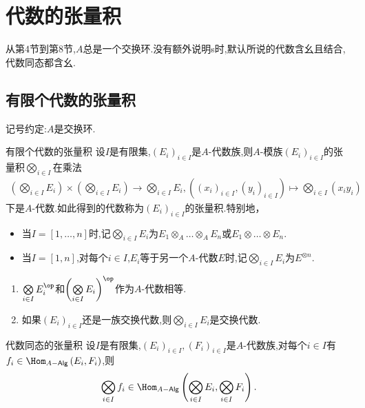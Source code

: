\chapter{代数的张量积}

从第$4$节到第$8$节,$A$总是一个交换环.没有额外说明s时,默认所说的代数含幺且结合,代数同态都含幺.

\section{有限个代数的张量积}

记号约定:$A$是交换环.

\begin{definition}{有限个代数的张量积}{}
	设$I$是有限集,$\left(E_{i}\right)_{i\in I}$是$A$-代数族,则$A$-模族$\left(E_{i}\right)_{i\in I}$的张量积$\bigotimes\limits_{i\in I}$在乘法
	\begin{align*}
		\left(\bigotimes\limits_{i\in I}E_{i}\right)\times\left(\bigotimes\limits_{i\in I}E_{i}\right)\to\bigotimes\limits_{i\in I}E_{i},\left(\left(x_{i}\right)_{i\in I},\left(y_{i}\right)_{i\in I}\right)\mapsto\bigotimes\limits_{i\in I}\left(x_{i}y_{i}\right)
	\end{align*}
	下是$A$-代数.如此得到的代数称为$\left(E_{i}\right)_{i\in I}$的张量积.特别地，
	\begin{itemize}
		\item 当$I=\left[1,\ldots,n\right]$时,记$\bigotimes\limits_{i\in I}E_{i}$为$E_{1}\otimes_{A}\ldots\otimes_{A}E_{n}$或$E_{1}\otimes\ldots\otimes E_{n}$.
		\item 当$I=\left[1,n\right]$,对每个$i\in I$,$E_{i}$等于另一个$A$-代数$E$时,记$\bigotimes\limits_{i\in I}E_{i}$为$E^{\otimes n}$.
	\end{itemize}
\end{definition}

\begin{remark}{}{}
	\begin{enumerate}
		\item $\bigotimes\limits_{i\in I}E_{i}^{\op}$和$\left(\bigotimes\limits_{i\in I}E_{i}\right)^{\op}$作为$A$-代数相等.
		\item 如果$\left(E_{i}\right)_{i\in I}$还是一族交换代数,则$\bigotimes\limits_{i\in I}E_{i}$是交换代数.
	\end{enumerate}
\end{remark}

\begin{proposition}{代数同态的张量积}{}
	设$I$是有限集,$\left(E_{i}\right)_{i\in I},\left(F_{i}\right)_{i\in I}$是$A$-代数族,对每个$i\in I$有$f_{i}\in\Hom_{A-\mathsf{Alg}}\left(E_{i},F_{i}\right)$,则
	\begin{align*}
		\bigotimes\limits_{i\in I}f_{i}\in\Hom_{A-\mathsf{Alg}}\left(\bigotimes\limits_{i\in I}E_{i},\bigotimes\limits_{i\in I}F_{i}\right).
	\end{align*}
\end{proposition}

